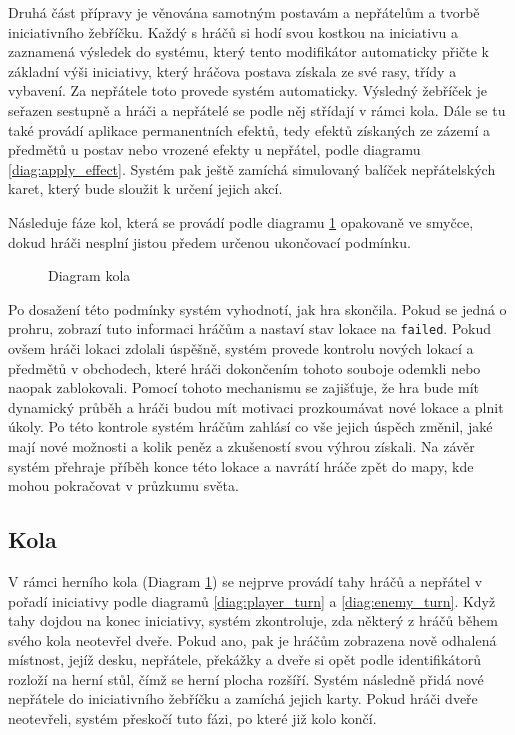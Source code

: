 Druhá část přípravy je věnována samotným postavám a nepřátelům a tvorbě iniciativního žebříčku. Každý s hráčů si hodí svou kostkou na iniciativu a zaznamená výsledek do systému, který tento modifikátor automaticky přičte k základní výši iniciativy, který hráčova postava získala ze své rasy, třídy a vybavení. Za nepřátele toto provede systém automaticky. Výsledný žebříček je seřazen sestupně a hráči a nepřátelé se podle něj střídají v rámci kola. Dále se tu také provádí aplikace permanentních efektů, tedy efektů získaných ze zázemí a předmětů u postav nebo vrozené efekty u nepřátel, podle diagramu \ref{diag:apply_effect}. Systém pak ještě zamíchá simulovaný balíček nepřátelských karet, který bude sloužit k určení jejich akcí.

Následuje fáze kol, která se provádí podle diagramu \ref{diag:round} opakovaně ve smyčce, dokud hráči nesplní jistou předem určenou ukončovací podmínku.

\begin{figure}[h]
    \centering
    \caption{Diagram kola}
    \label{diag:round}
\end{figure}

Po dosažení této podmínky systém vyhodnotí, jak hra skončila. Pokud se jedná o prohru, zobrazí tuto informaci hráčům a nastaví stav lokace na \texttt{failed}. Pokud ovšem hráči lokaci zdolali úspěšně, systém provede kontrolu nových lokací a předmětů v obchodech, které hráči dokončením tohoto souboje odemkli nebo naopak zablokovali. Pomocí tohoto mechanismu se zajišťuje, že hra bude mít dynamický průběh a hráči budou mít motivaci prozkoumávat nové lokace a plnit úkoly. Po této kontrole systém hráčům zahlásí co vše jejich úspěch změnil, jaké mají nové možnosti a kolik peněz a zkušeností svou výhrou získali. Na závěr systém přehraje příběh konce této lokace a navrátí hráče zpět do mapy, kde mohou pokračovat v průzkumu světa.


\subsection{Kola}
\label{subsec:design_rounds}

V rámci herního kola (Diagram \ref{diag:round}) se nejprve provádí tahy hráčů a nepřátel v pořadí iniciativy podle diagramů \ref{diag:player_turn} a \ref{diag:enemy_turn}. Když tahy dojdou na konec iniciativy, systém zkontroluje, zda některý z hráčů během svého kola neotevřel dveře. Pokud ano, pak je hráčům zobrazena nově odhalená místnost, jejíž desku, nepřátele, překážky a dveře si opět podle identifikátorů rozloží na herní stůl, čímž se herní plocha rozšíří. Systém následně přidá nové nepřátele do iniciativního žebříčku a zamíchá jejich karty. Pokud hráči dveře neotevřeli, systém přeskočí tuto fázi, po které již kolo končí.


